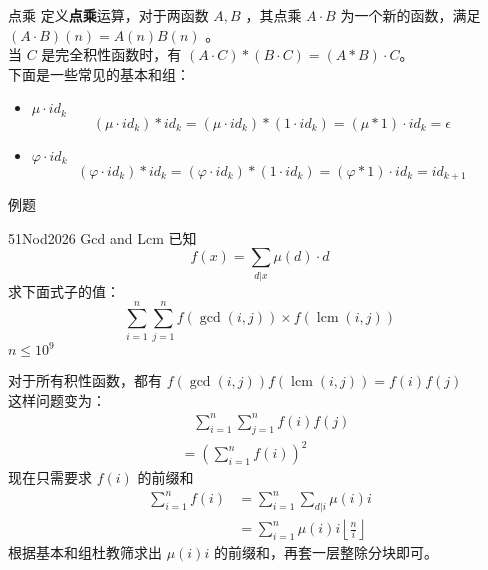\documentclass[UTF8]{beamer}
\begin{document}
    \begin{frame}{点乘}
        定义\textbf{点乘}运算，对于两函数 $A, B$ ，其点乘 $A\cdot B$ 为一个新的函数，满足 $(A\cdot B)(n) = A(n)B(n)$ 。\\
        当 $C$ 是完全积性函数时，有 $(A\cdot C) \ast (B\cdot C) = (A \ast B)\cdot C$。\\
        \pause
        下面是一些常见的基本和组：
        \begin{itemize}
            \item $\mu \cdot id_k$\\
            $$
            (\mu \cdot id_k)\ast id_k=(\mu \cdot id_k)\ast(1\cdot id_k)=(\mu \ast 1)\cdot id_k=\epsilon
            $$
            \item $\varphi \cdot id_k$\\
            $$
            (\varphi \cdot id_k)\ast id_k=(\varphi \cdot id_k)\ast(1\cdot id_k)=(\varphi \ast 1)\cdot id_k=id_{k+1}
            $$
        \end{itemize}
    \end{frame}


    \begin{frame}{例题}
        \begin{block}{51Nod2026 Gcd and Lcm}
            已知 
            $$
            f(x)=\sum_{d|x}\mu(d)\cdot d
            $$
            求下面式子的值：
            $$
            \sum_{i=1}^n\sum_{j=1}^nf(\gcd(i,j))\times f(\operatorname{lcm}(i,j))
            $$
            $n\le 10^9$
        \end{block}
    \end{frame}
    \begin{frame}
        对于所有积性函数，都有 $f(\gcd(i,j))f(\operatorname{lcm}(i,j))=f(i)f(j)$\\
        这样问题变为：
        $$
        \begin{aligned}
            &\ \ \ \ \sum_{i=1}^n\sum_{j=1}^nf(i)f(j)\\
            &=\left(\sum_{i=1}^nf(i)\right)^2
        \end{aligned}
        $$
        现在只需要求 $f(i)$ 的前缀和
        \pause
        $$
        \begin{aligned}
        \sum_{i=1}^nf(i)&=\sum_{i=1}^n\sum_{d|i}\mu(i)i\\
        &=\sum_{i=1}^n\mu(i)i\left\lfloor\frac{n}{i}\right\rfloor
        \end{aligned}
        $$
        根据基本和组杜教筛求出 $\mu(i)i$ 的前缀和，再套一层整除分块即可。
    \end{frame}
\end{document}

